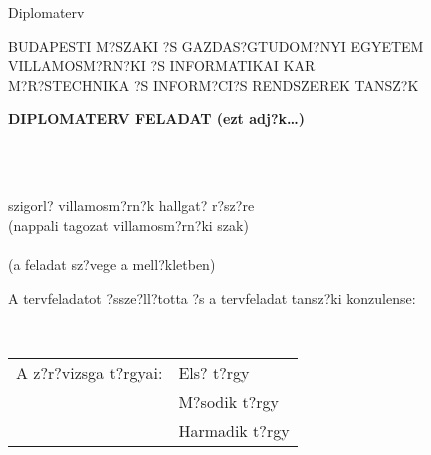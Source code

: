  \begin{center}

 \vspace*{12mm}
 \LARGE{Diplomaterv}

 \vspace{8mm}
 \large{\nev}
 \vfill
 \ev
 \end{center}
 \thispagestyle{empty}
 \blankpage

\begin{center}

 \uppercase{Budapesti M?szaki ?s Gazdas?gtudom?nyi Egyetem}\\
 \uppercase{Villamosm?rn?ki ?s Informatikai Kar}\\
 \uppercase{M?r?stechnika ?s Inform?ci?s Rendszerek Tansz?k}

 \vspace{6mm}
 \large\textbf{DIPLOMATERV FELADAT (ezt adj?k\dots)}

 \vspace{6mm}
 \textbf{\nev} \\ \strut \\
 szigorl? villamosm?rn?k hallgat? r?sz?re\\
 (nappali tagozat villamosm?rn?ki szak) \\

 \vspace{6mm}
 \textbf{\cim}\\
 (a feladat sz?vege a mell?kletben)

\end{center}

 \vspace{6mm}
 A tervfeladatot ?ssze?ll?totta ?s a tervfeladat
tansz?ki konzulense:

\begin{center}
\konzulens\\ \konzbeoszt
\end{center}

 \vspace{6mm}
 \begin{tabular}{p{80mm}l}
A z?r?vizsga t?rgyai:   & Els? t?rgy \\
                        & M?sodik t?rgy \\
                        & Harmadik t?rgy
 \end{tabular}

